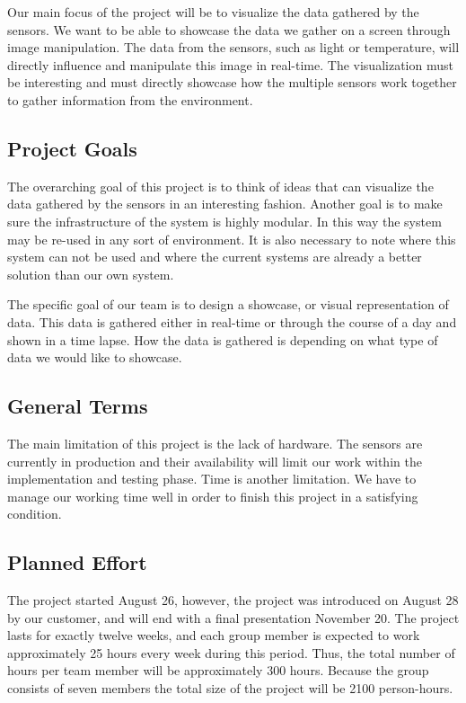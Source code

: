\documentclass[../document.tex]{subfiles}
\begin{document}
Our main focus of the project will be to visualize the data gathered by the sensors. We want to be able to showcase the data we gather on a screen through image manipulation. The data from the sensors, such as light or temperature, will directly influence and manipulate this image in real-time. The visualization must be interesting and must directly showcase how the multiple sensors work together to gather information from the environment.

\subsection{Project Goals}
The overarching goal of this project is to think of ideas that can visualize the data gathered by the sensors in an interesting fashion. Another goal is to make sure the infrastructure of the system is highly modular. In this way the system may be re-used in any sort of environment. It is also necessary to note where this system can not be used and where the current systems are already a better solution than our own system.

The specific goal of our team is to design a showcase, or visual representation of data. This data is gathered either in real-time or through the course of a day and shown in a time lapse. How the data is gathered is depending on what type of data we would like to showcase. 

\subsection{General Terms}
The main limitation of this project is the lack of hardware. The sensors are currently in production and their availability will limit our work within the implementation and testing phase. Time is another limitation. We have to manage our working time well in order to finish this project in a satisfying condition.

\subsection{Planned Effort}
The project started August 26, however, the project was introduced on August 28 by our customer, and will end with a final presentation November 20. The project lasts for exactly twelve weeks, and each group member is expected to work approximately 25 hours every week during this period. Thus, the total number of hours per team member will be approximately 300 hours. Because the group consists of seven members the total size of the project will be 2100 person-hours. 
\end{document}
